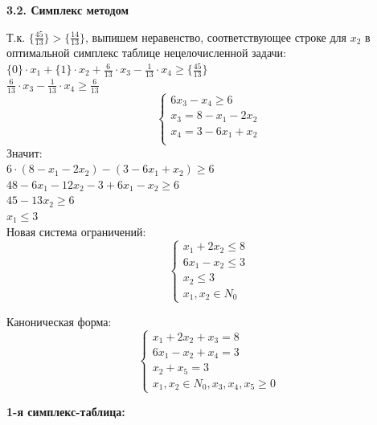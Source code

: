 \begin{flushleft}
    {\bf3.2. Симплекс методом}\\
\end{flushleft}

Т.к. $\{\frac{45}{13}\} > \{\frac{14}{13}\}$, выпишем неравенство, соответствующее строке для $x_2$ в оптимальной симплекс таблице нецелочисленной задачи:\\
$\{0\} \cdot x_1 + \{1\} \cdot x_2 + \frac{6}{13} \cdot x_3 -\frac{1}{13} \cdot x_4 \ge \{\frac{45}{13}\}$\\
$\frac{6}{13} \cdot x_3 - \frac{1}{13} \cdot x_4 \ge \frac{6}{13}$\\
\begin{equation*}
    \begin{cases}
        6x_3 - x_4 \ge 6 \\
        x_3 = 8 - x_1 - 2x_2\\
        x_4 = 3 - 6x_1 + x_2\\
    \end{cases}
\end{equation*}
Значит:\\
$6\cdot (8 - x_1 - 2x_2) - (3 - 6x_1 + x_2) \ge 6$\\
$48 - 6x_1 - 12x_2 - 3 + 6x_1 - x_2 \ge 6$\\
$45 - 13x_2 \ge 6$\\
$x_1 \le 3$\\

Новая система ограничений:
\begin{equation*}
    \begin{cases}
        x_1 + 2x_2 \le 8 \\
        6x_1 - x_2 \le 3 \\
        x_2 \le 3\\
        x_1, x_2 \in N_0 
    \end{cases}
\end{equation*}

Каноническая форма:
\begin{equation*}
    \begin{cases}
        x_1 + 2x_2 + x_3 = 8 \\
        6x_1 - x_2 + x_4 = 3 \\
        x_2 + x_5 = 3\\
        x_1, x_2 \in N_0, x_3, x_4, x_5 \ge 0 
    \end{cases}
\end{equation*}

{\bf1-я симплекс-таблица:}

